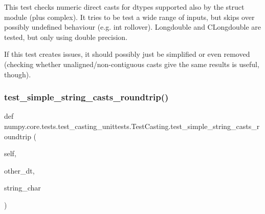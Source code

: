 \begin{DoxyVerb}This test checks numeric direct casts for dtypes supported also by the
struct module (plus complex).  It tries to be test a wide range of
inputs, but skips over possibly undefined behaviour (e.g. int rollover).
Longdouble and CLongdouble are tested, but only using double precision.

If this test creates issues, it should possibly just be simplified
or even removed (checking whether unaligned/non-contiguous casts give
the same results is useful, though).
\end{DoxyVerb}
 \mbox{\label{classnumpy_1_1core_1_1tests_1_1test__casting__unittests_1_1TestCasting_a706dedf1672a9b781097f3e70ff967b0}} 
\subsubsection{\texorpdfstring{test\+\_\+simple\+\_\+string\+\_\+casts\+\_\+roundtrip()}{test\_simple\_string\_casts\_roundtrip()}}
{\footnotesize\ttfamily def numpy.\+core.\+tests.\+test\+\_\+casting\+\_\+unittests.\+Test\+Casting.\+test\+\_\+simple\+\_\+string\+\_\+casts\+\_\+roundtrip (\begin{DoxyParamCaption}\item[{}]{self,  }\item[{}]{other\+\_\+dt,  }\item[{}]{string\+\_\+char }\end{DoxyParamCaption})}

